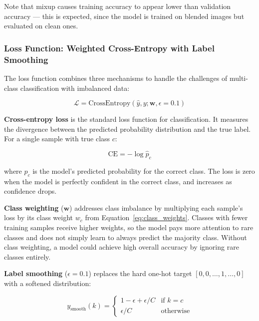 \documentclass[12pt, a4paper]{article}
\begin{document}
Note that mixup causes training accuracy to appear lower than validation
accuracy --- this is expected, since the model is trained on blended images but
evaluated on clean ones.

\subsubsection{Loss Function: Weighted Cross-Entropy with Label Smoothing}

The loss function combines three mechanisms to handle the challenges of
multi-class classification with imbalanced data:

\begin{equation}
\mathcal{L} = \text{CrossEntropy}(\hat{y}, y; \mathbf{w}, \epsilon=0.1)
\end{equation}

\textbf{Cross-entropy loss} is the standard loss function for classification.
It measures the divergence between the predicted probability distribution and
the true label.  For a single sample with true class $c$:

\begin{equation}
\text{CE} = -\log \hat{p}_c
\end{equation}

where $\hat{p}_c$ is the model's predicted probability for the correct class.
The loss is zero when the model is perfectly confident in the correct class, and
increases as confidence drops.

\textbf{Class weighting} ($\mathbf{w}$) addresses class imbalance by
multiplying each sample's loss by its class weight $w_c$ from
Equation~\ref{eq:class_weights}.  Classes with fewer training samples receive
higher weights, so the model pays more attention to rare classes and does not
simply learn to always predict the majority class.  Without class weighting, a
model could achieve high overall accuracy by ignoring rare classes entirely.

\textbf{Label smoothing} ($\epsilon = 0.1$) replaces the hard one-hot target
$[0, 0, \ldots, 1, \ldots, 0]$ with a softened distribution:

\begin{equation}
y_{\text{smooth}}(k) =
\begin{cases}
1 - \epsilon + \epsilon / C & \text{if } k = c \\
\epsilon / C & \text{otherwise}
\end{cases}
\end{equation}
\end{document}

